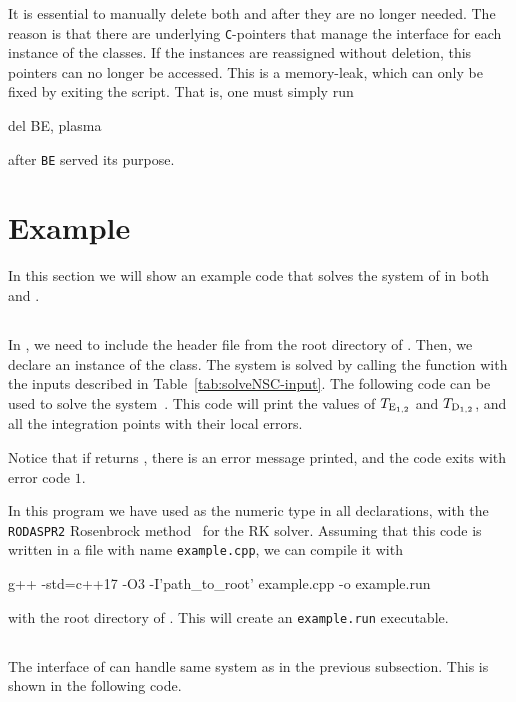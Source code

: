 \documentclass[11pt,a4paper]{article}
\begin{document}
It is essential to manually delete both  and  after they are no longer needed. The reason is that there are underlying {\tt C}-pointers that manage the \PY interface for each instance of the classes. If the instances are reassigned without deletion, this pointers can no longer be accessed. This is a memory-leak, which can only be fixed by exiting the script. 
%
That is, one must simply run 
%
\begin{py}
	del BE, plasma
\end{py}  
%
after {\tt BE} served its purpose.

\section{Example}\label{sec:example}
\setcounter{equation}{0}
%
In this section we will show an example code that solves the system of  in both \CPP and \PY.
%
\subsection{\CPP}
%
In \CPP, we need to include the header file  from the root directory of \nsc. Then, we declare an instance of the  class. The system is solved by calling the  function with the inputs described in Table~\ref{tab:solveNSC-input}. The following code can be used to solve the system~. This code will print the values of $T_{\rm E_{1,2}}$ and $T_{\rm D_{1,2}}$, and all the integration points with their local errors.
%
\lstset{language = c++}

%
Notice that if  returns , there is an error message printed, and the code exits  with error code $1$.

In this program we have used  as the numeric type in all declarations, with the {\tt RODASPR2} Rosenbrock method~\cite{RangAngermann2005} for the RK solver. Assuming that this code is written in a file with name {\tt example.cpp}, we can compile it with 
%
\begin{bash}
	g++ -std=c++17 -O3 -I'path_to_root' example.cpp -o example.run	
\end{bash}
%
with  the root directory of \nsc. This will create an {\tt example.run} executable.

\subsection{\PY}
%
The \PY interface of \nsc can handle same system as in the previous subsection. This is shown in the following code.
%
\lstset{language = python}

%
\end{document}

